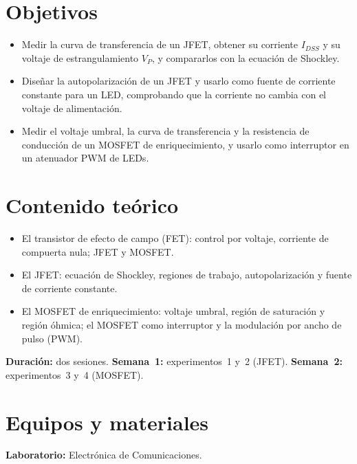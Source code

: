 \documentclass[11pt,a4paper]{article}
\begin{document}
\section{Objetivos}
\begin{itemize}
    \item Medir la curva de transferencia de un JFET, obtener su corriente $I_{DSS}$ y su
          voltaje de estrangulamiento $V_P$, y compararlos con la ecuación de Shockley.
    \item Diseñar la autopolarización de un JFET y usarlo como fuente de corriente constante
          para un LED, comprobando que la corriente no cambia con el voltaje de alimentación.
    \item Medir el voltaje umbral, la curva de transferencia y la resistencia de conducción
          de un MOSFET de enriquecimiento, y usarlo como interruptor en un atenuador PWM de
          LEDs.
\end{itemize}

\section{Contenido teórico}
\begin{itemize}
    \item El transistor de efecto de campo (FET): control por voltaje, corriente de compuerta
          nula; JFET y MOSFET.
    \item El JFET: ecuación de Shockley, regiones de trabajo, autopolarización y fuente de
          corriente constante.
    \item El MOSFET de enriquecimiento: voltaje umbral, región de saturación y región óhmica;
          el MOSFET como interruptor y la modulación por ancho de pulso (PWM).
\end{itemize}

\noindent\textbf{Duración:} dos sesiones. \textbf{Semana~1:} experimentos~1 y~2 (JFET).
\textbf{Semana~2:} experimentos~3 y~4 (MOSFET).

\section{Equipos y materiales}
\noindent\textbf{Laboratorio:} Electrónica de Comunicaciones.
\end{document}
